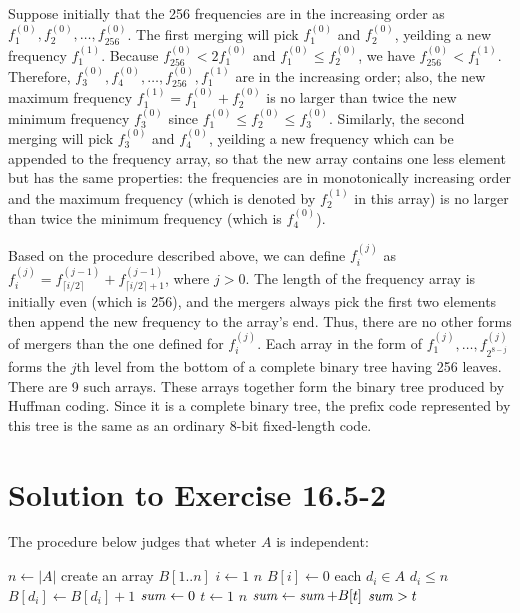 \documentclass[fleqn]{article}
\begin{document}
Suppose initially that the 256 frequencies are in the increasing order
as $f_1^{(0)}, f_2^{(0)}, \ldots, f_{256}^{(0)}$. The first merging
will pick $f_1^{(0)}$ and $f_2^{(0)}$, yeilding a new frequency
$f_1^{(1)}$. Because $f_{256}^{(0)} < 2f_1^{(0)}$ and $f_1^{(0)} \leq
f_2^{(0)}$, we have $f_{256}^{(0)} < f_1^{(1)}$. Therefore,
$f_3^{(0)}, f_4^{(0)}, \ldots, f_{256}^{(0)}, f_1^{(1)}$ are in the
increasing order; also, the new maximum frequency $f_1^{(1)} =
f_1^{(0)} + f_2^{(0)}$ is no larger than twice the new minimum
frequency $f_3^{(0)}$ since $f_1^{(0)} \leq f_2^{(0)} \leq f_3^{(0)}$.
Similarly, the second merging will pick $f_3^{(0)}$ and $f_4^{(0)}$,
yeilding a new frequency which can be appended to the frequency array,
so that the new array contains one less element but has the same
properties: the frequencies are in monotonically increasing order and
the maximum frequency (which is denoted by $f_2^{(1)}$ in this array)
is no larger than twice the minimum frequency (which is $f_4^{(0)}$).

Based on the procedure described above, we can define $f_i^{(j)}$ as
$f_i^{(j)} = f_{\lceil i/2 \rceil}^{(j-1)} + f_{\lceil i/2 \rceil +
1}^{(j-1)}$, where $j > 0$. The length of the frequency array is
initially even (which is 256), and the mergers always pick the first
two elements then append the new frequency to the array's end.  Thus,
there are no other forms of mergers than the one defined for
$f_i^{(j)}$. Each array in the form of $f_1^{(j)}, \ldots,
f_{2^{8-j}}^{(j)}$ forms the $j$th level from the bottom of a complete
binary tree having 256 leaves. There are 9 such arrays. These arrays
together form the binary tree produced by Huffman coding. Since it is
a complete binary tree, the prefix code represented by this tree is
the same as an ordinary 8-bit fixed-length code.






\section*{Solution to Exercise 16.5-2}

The procedure  below judges that wheter $A$ is
independent:

\begin{codebox}
\li $n \gets |A|$
\li create an array $B[1..n]$
\li \For $i \gets 1$ \To $n$
\li   \Do
        $B[i] \gets 0$
      \End
\li \For each $d_i \in A$
\li   \Do
        \If $d_i \leq n$
\li       \Then
            $B[d_i] \gets B[d_i] + 1$
          \End
      \End
\li $\id{sum} \gets 0$
\li \For $t \gets 1$ \To $n$
\li   \Do
        $\id{sum} \gets \id{sum} + B[t]$
\li     \If $\id{sum} > t$
\li       \Then
            \Return {}
          \End
      \End
\li \Return {}
\end{codebox}
\end{document}
